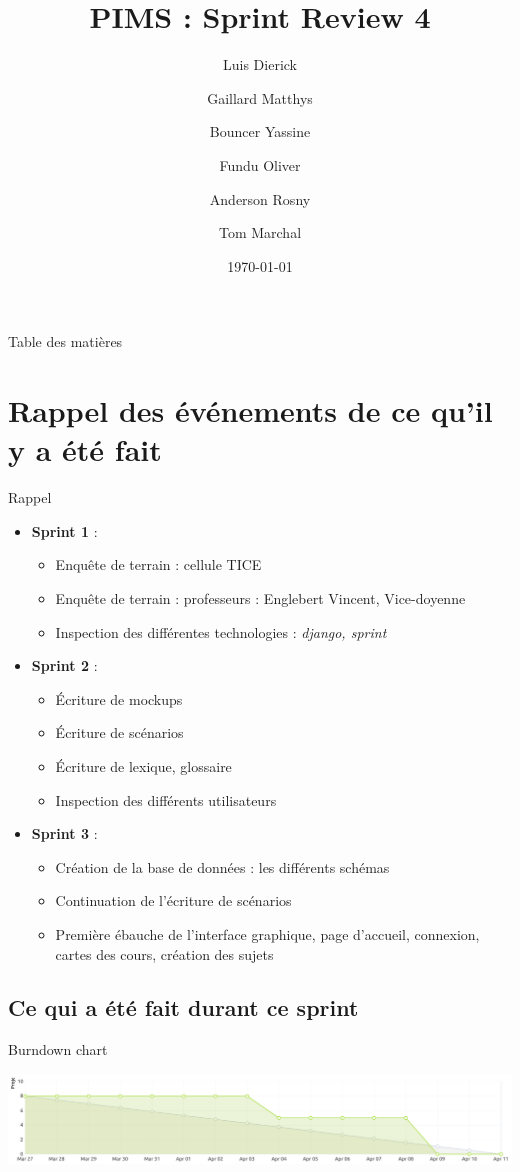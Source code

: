 \documentclass[numbering=fraction]{beamer}
\title{PIMS : Sprint Review 4}
\author[PIMS]{Luis Dierick \and Gaillard Matthys \and Bouncer Yassine \and Fundu Oliver \and Anderson Rosny \and Tom Marchal }
\institute{Université de Namur}
\date{\today}
\begin{document}
\begin{frame}[plain]{}
    \maketitle
\end{frame}

\begin{frame}{Table des matières}
    \tableofcontents
\end{frame}
\section{Rappel des événements de ce qu'il y a été fait}
\begin{frame}{Rappel}
    \begin{itemize}
        \item \textbf{Sprint 1} :
        \begin{itemize}
            \item Enquête de terrain : cellule TICE 
            \item Enquête de terrain : professeurs : Englebert Vincent, Vice-doyenne
            \item Inspection des différentes technologies : \textit{django, sprint}
        \end{itemize}
        \item \textbf{Sprint 2} : 
        \begin{itemize}
            \item Écriture de mockups
            \item Écriture de scénarios
            \item Écriture de lexique, glossaire
            \item Inspection des différents utilisateurs
        \end{itemize}
        \item \textbf{Sprint 3} :
        \begin{itemize}
            \item Création de la base de données : les différents schémas
            \item Continuation de l'écriture de scénarios
            \item Première ébauche de l'interface graphique, page d'accueil, connexion, cartes des cours, création des sujets
        \end{itemize}
    \end{itemize}
\end{frame}
\subsection{Ce qui a été fait durant ce sprint}
\begin{frame}{Burndown chart}
    \centering
    
    \includegraphics[width=1.1\textwidth]{burndownChart.png} 
\end{frame}
\end{document}
